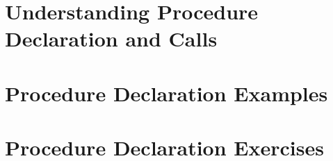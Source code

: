 









\clearpage
\def\pageLang{none}
\section{Understanding Procedure Declaration and Calls} %
\label{sec:understanding_procedure_declaration_and_calls}




\clearpage
\section{Procedure Declaration Examples} %
\label{sec:procedure_declaration_examples}




\clearpage
\section{Procedure Declaration Exercises} %
\label{sec:procedure_declaration_exercises}








